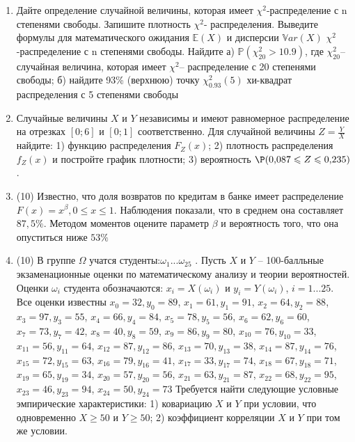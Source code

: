 \documentclass[a4paper,10pt]{article}
\begin{document}
\begin{enumerate}


\item


Дайте определение случайной величины, которая имеет $\chi ^{2}$-распределение с n степенями свободы.
Запишите плотность $\chi ^{2}$- распределения. Выведите формулы для математического ожидания $\mathbb{E}(X)$ и дисперсии $\mathbb{V}ar(X)$ $\chi ^{2}$-распределение с n степенями свободы. Найдите а) $\mathbb{P}(\chi _{20}^{2} > 10.9)$, где $\chi _{20}^{2}$–случайная величина, которая имеет $\chi ^{2}$– распределение с 20 степенями свободы; б) найдите 93\%
(верхнюю) точку $\chi _{0.93}^{2} (5)$ хи-квадрат распределения с 5 степенями свободы


\item



Случайные величины $X$ и $Y$ независимы и имеют равномерное
распределение на отрезках $[0;6]$ и $[0;1]$ соответственно. Для случайной величины $Z=\frac{Y}{X}$ найдите: 
1) функцию распределения $F_Z(x)$;
2) плотность распределения $f_Z(x)$ и постройте график плотности;
3) вероятность $\P(0,\!087\leqslant Z\leqslant 0,\!235)$.


\item


(10) Известно, что доля возвратов по кредитам в банке имеет распределение $F(x) = x ^{\beta}, 0 \leqslant x \leqslant 1$.
Наблюдения показали, что в среднем она составляет $87,5\%$. Методом моментов оцените параметр $\beta$ и
вероятность того, что она опуститься ниже $53\%$


\item


(10) В группе $\Omega$ учатся студенты:$\omega _{1}...\omega _{25}$ . Пусть $X$ и $Y$ – 100-балльные экзаменационные оценки по
математическому анализу и теории вероятностей. Оценки $\omega _{i}$ студента обозначаются: $x _{i} = X(\omega _{i})$ и $y _{i} = Y(\omega _{i})$, $i = 1...25$. Все оценки известны
$x _{0} = 32, y _{0} = 89$, $x _{1} = 61, y _{1} = 91$, $x _{2} = 64, y _{2} = 88$, $x _{3} = 97, y _{3} = 55$, $x _{4} = 66, y _{4} = 84$, $x _{5} = 78, y _{5} = 56$, $x _{6} = 62, y _{6} = 60$, $x _{7} = 73, y _{7} = 42$, $x _{8} = 40, y _{8} = 59$, $x _{9} = 86, y _{9} = 80$, $x _{10} = 76, y _{10} = 33$, $x _{11} = 56, y _{11} = 64$, $x _{12} = 87, y _{12} = 86$, $x _{13} = 70, y _{13} = 38$, $x _{14} = 87, y _{14} = 76$, $x _{15} = 72, y _{15} = 63$, $x _{16} = 79, y _{16} = 41$, $x _{17} = 33, y _{17} = 74$, $x _{18} = 67, y _{18} = 71$, $x _{19} = 65, y _{19} = 34$, $x _{20} = 57, y _{20} = 56$, $x _{21} = 63, y _{21} = 87$, $x _{22} = 68, y _{22} = 95$, $x _{23} = 46, y _{23} = 94$, $x _{24} = 50, y _{24} = 73$
Требуется
найти следующие условные эмпирические характеристики: 1) ковариацию $X$ и $Y$ при условии, что одновременно $X \geqslant 50$
 и $Y \geqslant 50$; 2) коэффициент корреляции $X$ и $Y$ при том же условии.



\end{enumerate}
\end{document}
